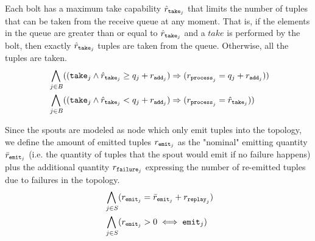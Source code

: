 Each bolt has a maximum take capability $\hat{r}_{\mathtt{take}_{j}}$ that limits the number of tuples that can be taken from the receive queue at any moment. That is, if the elements in the queue are greater than or equal to $\hat{r}_{\mathtt{take}_{j}}$ and a $take$ is performed by the bolt, then exactly $\hat{r}_{\mathtt{take}_{j}}$ tuples are taken from the queue. Otherwise, all the tuples are taken. 
\begin{align*}
%
%
& \bigwedge_{
\begin{subarray}{c}
\,j \in B
\end{subarray}
}((\ta{j} \land \rth{j} \geq q_j + \ra{j}) \Rightarrow (\rp{j} = q_j + \ra{j})) \\
%
%
%
%
& \bigwedge_{
\begin{subarray}{c}
\,j \in B
\end{subarray}
}((\ta{j} \land \rth{j} < q_j + \ra{j}) \Rightarrow (\rp{j} = \rth{j}))
%
%
\end{align*}

Since the spouts are modeled as node which only emit tuples into the topology, we define the amount of emitted tuples $r_{\mathtt{emit}_{j}}$ as the "nominal" emitting quantity $\bar{r}_{\mathtt{emit}_{j}}$ (i.e. the quantity of tuples that the spout would emit if no failure happens) plus the additional quantity $r_{\mathtt{failure}_{j}}$ expressing the number of re-emitted tuples due to failures in the topology.
\begin{align*}
%
& \bigwedge_{
\begin{subarray}{c}
\,j \in S\\
\end{subarray}
} ( \re{j} = \reb{j} + \rr{j}) \\
%
%
& \bigwedge_{
\begin{subarray}{c}
\,j \in S\\
\end{subarray}
} ( \re{j} > 0 \iff \e{j}) \\
%
%
\end{align*}






